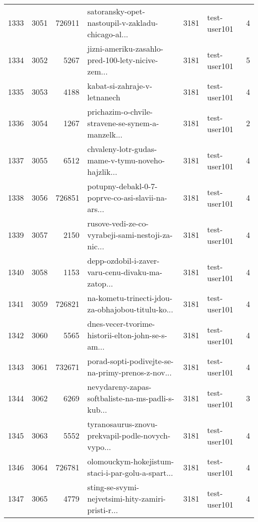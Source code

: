 \begin{tabular}{lrrlrlr}
1333 &       3051 &   726911 &  satoransky-opet-nastoupil-v-zakladu-chicago-al... &     3181 &                 test-user101 &               4 \\
1334 &       3052 &     5267 &  jizni-ameriku-zasahlo-pred-100-lety-nicive-zem... &     3181 &                 test-user101 &               5 \\
1335 &       3053 &     4188 &                       kabat-si-zahraje-v-letnanech &     3181 &                 test-user101 &               4 \\
1336 &       3054 &     1267 &  prichazim-o-chvile-stravene-se-synem-a-manzelk... &     3181 &                 test-user101 &               2 \\
1337 &       3055 &     6512 &  chvaleny-lotr-gudas-mame-v-tymu-noveho-hajzlik... &     3181 &                 test-user101 &               4 \\
1338 &       3056 &   726851 &  potupny-debakl-0-7-poprve-co-asi-slavii-na-ars... &     3181 &                 test-user101 &               4 \\
1339 &       3057 &     2150 &  rusove-vedi-ze-co-vyrabeji-sami-nestoji-za-nic... &     3181 &                 test-user101 &               4 \\
1340 &       3058 &     1153 &  depp-ozdobil-i-zaver-varu-cenu-divaku-ma-zatop... &     3181 &                 test-user101 &               4 \\
1341 &       3059 &   726821 &  na-kometu-trinecti-jdou-za-obhajobou-titulu-ko... &     3181 &                 test-user101 &               4 \\
1342 &       3060 &     5565 &  dnes-vecer-tvorime-historii-elton-john-se-s-am... &     3181 &                 test-user101 &               4 \\
1343 &       3061 &   732671 &  porad-sopti-podivejte-se-na-primy-prenos-z-nov... &     3181 &                 test-user101 &               4 \\
1344 &       3062 &     6269 &  nevydareny-zapas-softbaliste-na-ms-padli-s-kub... &     3181 &                 test-user101 &               3 \\
1345 &       3063 &     5552 &  tyranosaurus-znovu-prekvapil-podle-novych-vypo... &     3181 &                 test-user101 &               4 \\
1346 &       3064 &   726781 &  olomouckym-hokejistum-staci-i-par-golu-a-spart... &     3181 &                 test-user101 &               4 \\
1347 &       3065 &     4779 &  sting-se-svymi-nejvetsimi-hity-zamiri-pristi-r... &     3181 &                 test-user101 &               4 \\

\end{tabular}
